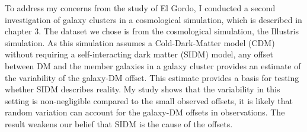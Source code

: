 \documentclass[ucdthesis.tex]{subfiles}
\begin{document}
		To address my concerns from the study of El Gordo, 
		I conducted a second investigation of galaxy clusters in a cosmological
		simulation, which is described in chapter 3. The dataset we chose is from the 
		cosmological simulation, the Illustris simulation. As this simulation
		assumes a Cold-Dark-Matter model (CDM) without requiring a self-interacting
		dark matter (SIDM) model, any offset between DM and the member galaxies in a 
		galaxy cluster provides an estimate of the variability of the galaxy-DM offset. This
		estimate provides a basis for testing whether SIDM describes reality. My
		study shows that 
		the variability in this setting is non-negligible compared to the
		small observed offsets, it is
		likely that random variation can account for the
		galaxy-DM offsets in observations. The result weakens our belief that SIDM is the
		cause of the offsets. 
\end{document}
